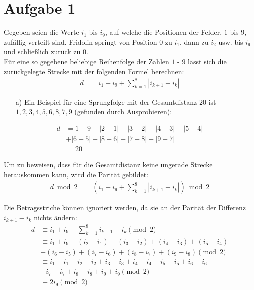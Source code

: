 \documentclass[12pt,a4paper,oneside]{article}
\begin{document}
\pagestyle{fancy}
\fancyhead[L]{\thepage}
\fancyfoot[]{}

\section[]{Aufgabe 1}
\setlength{\mathindent}{2cm}

Gegeben seien die Werte $i_1$ bis $i_9$, auf welche die Positionen der Felder, $1$ bis $9$, zufällig verteilt sind.
Fridolin springt von Position $0$ zu $i_1$, dann zu $i_2$ usw. bis $i_9$ und schließlich zurück zu $0$. \\[10pt]
Für eine so gegebene beliebige Reihenfolge der Zahlen $1$ - $9$ lässt sich die zurückgelegte Strecke mit der folgenden Formel berechnen:
\begin{align*}
	d &= i_1 + i_9 + \sum_{k=1}^{8} |i_{k+1} - i_k|
\end{align*}

\begin{itemize}
	\item[a)] Ein Beispiel für eine Sprungfolge mit der Gesamtdistanz $20$ ist \\
	$1, 2, 3, 4, 5, 6, 8, 7, 9$ (gefunden durch Ausprobieren):
\end{itemize}
\begin{align*}
	d &= 1 + 9 + |2-1|+|3-2|+|4-3|+|5-4| \\
	&+ |6-5|+|8-6|+|7-8|+|9-7| \\
	&= 20
\end{align*}

Um zu beweisen, dass für die Gesamtdistanz keine ungerade Strecke herauskommen kann, wird die Parität gebildet:
\begin{align*}
	d \bmod 2 &= \left(i_1 + i_9 + \sum_{k=1}^{8} |i_{k+1} - i_k|\right) \bmod 2
\end{align*}

Die Betragsstriche können ignoriert werden, da sie an der Parität der Differenz $i_{k+1}-i_k$ nichts ändern:
\begin{align*}
	d &\equiv i_1 + i_9 + \sum_{k=1}^{8} i_{k+1} - i_k \pmod 2 \\
	&\equiv i_1 + i_9 + (i_2 - i_1) + (i_3 - i_2) + (i_4 - i_3) + (i_5 - i_4) \\
	&+ (i_6 - i_5) + (i_7 - i_6) + (i_8 - i_7) + (i_9 - i_8) \pmod 2 \\[7pt]
	&\equiv i_1 - i_1 + i_2 - i_2 + i_3 - i_3 + i_4 - i_4 + i_5 - i_5 + i_6 - i_6 \\
	&+ i_7 - i_7 + i_8 - i_8 + i_9 + i_9 \pmod 2 \\[7pt]
	&\equiv 2 i_9 \pmod 2
\end{align*}
\end{document}
